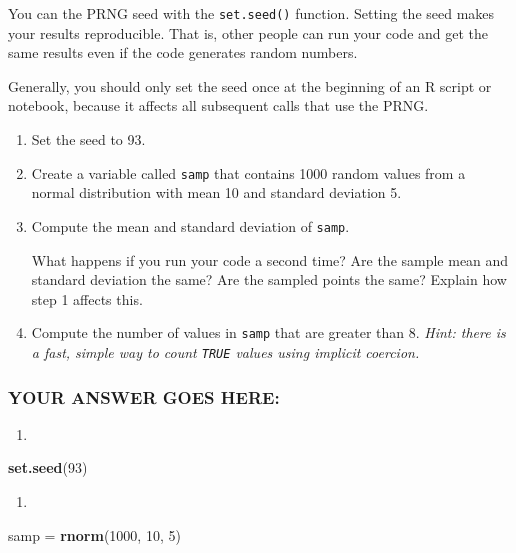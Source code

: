 \documentclass[
]{article}
\newenvironment{Shaded}{\begin{snugshade}}{\end{snugshade}}
\newcommand{\DecValTok}[1]{\textcolor[rgb]{0.00,0.00,0.81}{#1}}
\newcommand{\KeywordTok}[1]{\textcolor[rgb]{0.13,0.29,0.53}{\textbf{#1}}}
\newcommand{\NormalTok}[1]{#1}
\newcommand{\StringTok}[1]{\textcolor[rgb]{0.31,0.60,0.02}{#1}}
\providecommand{\tightlist}{%
  \setlength{\itemsep}{0pt}\setlength{\parskip}{0pt}}
\begin{document}
You can the PRNG seed with the \texttt{set.seed()} function. Setting the
seed makes your results reproducible. That is, other people can run your
code and get the same results even if the code generates random numbers.

Generally, you should only set the seed once at the beginning of an R
script or notebook, because it affects all subsequent calls that use the
PRNG.

\begin{enumerate}
\def\labelenumi{\arabic{enumi}.}
\item
  Set the seed to 93.
\item
  Create a variable called \texttt{samp} that contains 1000 random
  values from a normal distribution with mean 10 and standard deviation
  5.
\item
  Compute the mean and standard deviation of \texttt{samp}.

  What happens if you run your code a second time? Are the sample mean
  and standard deviation the same? Are the sampled points the same?
  Explain how step 1 affects this.
\item
  Compute the number of values in \texttt{samp} that are greater than 8.
  \emph{Hint: there is a fast, simple way to count \texttt{TRUE} values
  using implicit coercion.}
\end{enumerate}

\hypertarget{your-answer-goes-here-2}{%
\subsubsection{YOUR ANSWER GOES HERE:}\label{your-answer-goes-here-2}}

\begin{enumerate}
\def\labelenumi{\arabic{enumi}.}
\tightlist
\item
\end{enumerate}

\begin{Shaded}
\begin{Highlighting}[]
\KeywordTok{set.seed}\NormalTok{(}\DecValTok{93}\NormalTok{)}
\end{Highlighting}
\end{Shaded}

\begin{enumerate}
\def\labelenumi{\arabic{enumi}.}
\setcounter{enumi}{1}
\tightlist
\item
\end{enumerate}

\begin{Shaded}
\begin{Highlighting}[]
\NormalTok{samp =}\StringTok{ }\KeywordTok{rnorm}\NormalTok{(}\DecValTok{1000}\NormalTok{, }\DecValTok{10}\NormalTok{, }\DecValTok{5}\NormalTok{)}
\end{Highlighting}
\end{Shaded}
\end{document}
